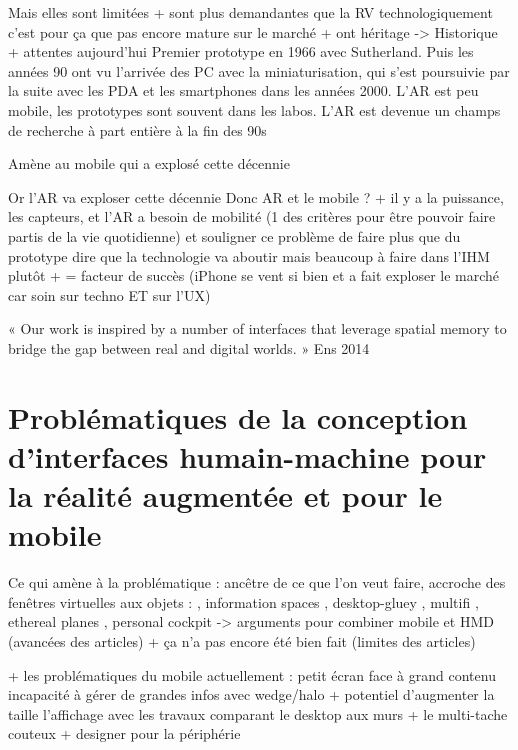 Mais elles sont limitées + sont plus demandantes que la RV technologiquement c'est pour ça que pas encore mature sur le marché + ont héritage -> Historique + attentes aujourd'hui
Premier prototype en 1966 avec Sutherland. Puis les années 90 ont vu l'arrivée des PC avec la miniaturisation, qui s'est poursuivie par la suite avec les PDA et les smartphones dans les années 2000. L'AR est peu mobile, les prototypes sont souvent dans les labos. L'AR est devenue un champs de recherche à part entière à la fin des 90s

Amène au mobile qui a explosé cette décennie

Or l'AR va exploser cette décennie
Donc AR et le mobile ? + il y a la puissance, les capteurs, et l'AR a besoin de mobilité (1 des critères pour être pouvoir faire partis de la vie quotidienne) \citep{VanKrevelenPoelman2010} et souligner ce problème de faire plus que du prototype \cite{HuangHuiPeyloEtAl2013}
dire que la technologie va aboutir mais beaucoup à faire dans l'IHM plutôt + = facteur de succès (iPhone se vent si bien et a fait exploser le marché car soin sur techno ET sur l'UX)

« Our work is inspired by a number of interfaces that leverage
spatial memory to bridge the gap between real and digital
worlds. » Ens 2014


\section*{Problématiques de la conception d'interfaces humain-machine pour la réalité augmentée et pour le mobile}
Ce qui amène à la problématique : ancêtre de ce que l'on veut faire, accroche des fenêtres virtuelles aux objets : \cite{FeinerMacIntyreHauptEtAl1993}, information spaces \cite{Fitzmaurice1993}, desktop-gluey \cite{SerranoEnsYangEtAl2015}, multifi \cite{GrubertHeinischQuigleyEtAl2015}, ethereal planes \cite{EnsHincapie-RamosIrani2014}, personal cockpit \cite{EnsFinneganIrani2014} -> arguments pour combiner mobile et HMD (avancées des articles) + ça n'a pas encore été bien fait (limites des articles)

+ les problématiques du mobile actuellement : petit écran face à grand contenu 
incapacité à gérer de grandes infos 
avec wedge/halo \cite{BaudischRosenholtz2003} \cite{GustafsonBaudischGutwinEtAl2008} \cite{BurigatChittaro2011} 
+ potentiel d'augmenter la taille l'affichage avec les travaux comparant le desktop aux murs \cite{LiuChapuisBeaudouin-LafonEtAl2014} \cite{ShuppBallYostEtAl2006} \cite{TanGergleScupelliEtAl2003}
+ le multi-tache couteux \cite{EnsFinneganIrani2014} \cite{RashidNacentaQuigley2012a}
+ designer pour la périphérie \cite{JonesBenkoOfekEtAl2013} \cite{CockburnKarlsonBederson2009}

